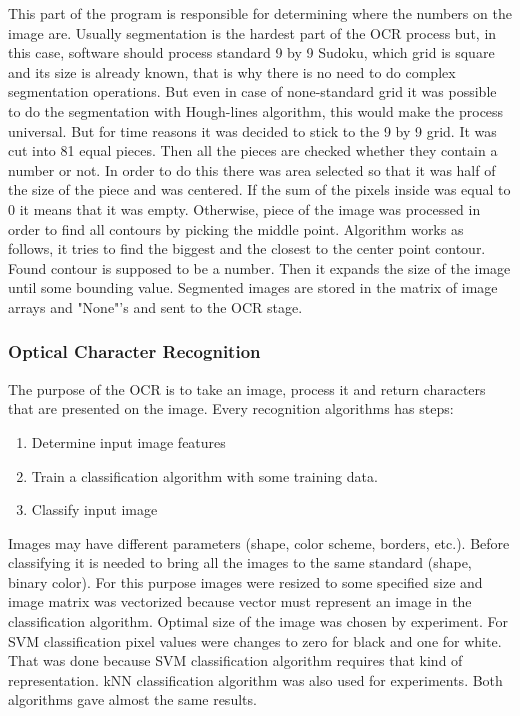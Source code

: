 \documentclass[../../main]{subfiles}
\begin{document}
This part of the program is responsible for determining where the numbers on the image are. Usually segmentation is the hardest part of the OCR process but, in this case, software should process standard 9 by 9 Sudoku, which grid is square and its size is already known, that is why there is no need to do complex segmentation operations. But even in case of none-standard grid it was possible to do the segmentation with Hough-lines algorithm, this would make the process universal. But for time reasons it was decided to stick to the 9 by 9 grid. It was cut into 81 equal pieces. Then all the pieces are checked whether they contain a number or not. In order to do this there was area selected so that it was half of the size of the piece and was centered. If the sum of the pixels inside was equal to 0 it means that it was empty. Otherwise, piece of the image was processed in order to find all contours by picking the middle point. Algorithm works as follows, it tries to find the biggest and the closest to the center point contour. Found contour is supposed to be a number. Then it expands the size of the image until some bounding value. Segmented images are stored in the matrix of image arrays and "None"'s and sent to the OCR stage.

\subsubsection{Optical Character Recognition}

The purpose of the OCR is to take an image, process it and return characters that are presented on the image.
Every recognition algorithms has steps:
\begin{enumerate}
\item  Determine input image features
\item  Train a classification algorithm with some training data.
\item  Classify input image
\end{enumerate}

Images may have different parameters (shape, color scheme, borders, etc.). Before classifying it is needed to bring all the images to the same standard (shape, binary color). For this purpose images were resized to some specified size and image matrix was vectorized because vector must represent an image in the classification algorithm. Optimal size of the image was chosen by experiment. For \ac{SVM} classification pixel values were changes to zero for black and one for white. That was done because \ac{SVM} classification algorithm requires that kind of representation. \ac{kNN} classification algorithm was also used for experiments.
Both algorithms gave almost the same results.
\end{document}
